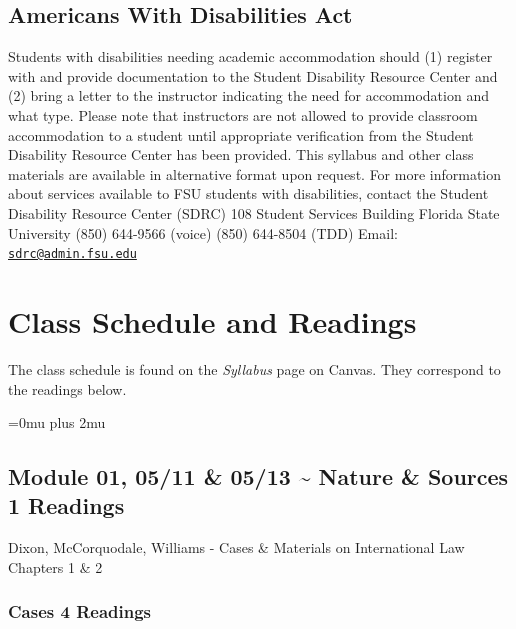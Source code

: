 \documentclass[10pt,]{article}
\begin{document}
\hypertarget{americans-with-disabilities-act}{%
\subsection{Americans With Disabilities
Act}\label{americans-with-disabilities-act}}

Students with disabilities needing academic accommodation should (1)
register with and provide documentation to the Student Disability
Resource Center and (2) bring a letter to the instructor indicating the
need for accommodation and what type. Please note that instructors are
not allowed to provide classroom accommodation to a student until
appropriate verification from the Student Disability Resource Center has
been provided. This syllabus and other class materials are available in
alternative format upon request. For more information about services
available to FSU students with disabilities, contact the Student
Disability Resource Center (SDRC) 108 Student Services Building
\textbar{} Florida State University \textbar{} (850) 644-9566 (voice)
\textbar{} (850) 644-8504 (TDD) \textbar{} Email:
\href{mailto:sdrc@admin.fsu.edu}{\nolinkurl{sdrc@admin.fsu.edu}}

\newpage

\hypertarget{class-schedule-and-readings}{%
\section{Class Schedule and
Readings}\label{class-schedule-and-readings}}

The class schedule is found on the \emph{Syllabus} page on Canvas. They
correspond to the readings below.

\Urlmuskip=0mu plus 2mu

\hypertarget{module-01-0511-0513-nature-sources-1-readings}{%
\subsection{Module 01, 05/11 \& 05/13 \textasciitilde{} Nature \&
Sources \textbar{} 1
Readings}\label{module-01-0511-0513-nature-sources-1-readings}}

Dixon, McCorquodale, Williams - Cases \& Materials on International Law
Chapters 1 \& 2

\hypertarget{cases-4-readings}{%
\subsubsection{Cases \textbar{} 4 Readings}\label{cases-4-readings}}
\end{document}

